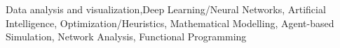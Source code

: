 \small{Data analysis and visualization,Deep Learning/Neural Networks, Artificial Intelligence, Optimization/Heuristics,
Mathematical Modelling, Agent-based Simulation, Network Analysis, Functional
Programming}


